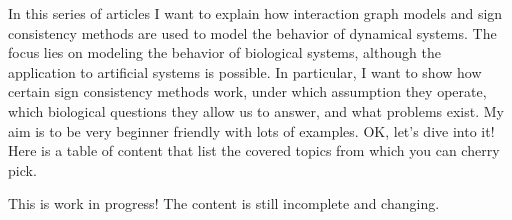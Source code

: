 In this series of articles I want to explain how interaction graph models
and sign consistency methods are used to model the behavior of dynamical systems.
The focus lies on modeling the behavior of biological systems, although the application to artificial systems is possible.
In particular, I want to show how certain sign consistency methods work, 
 under which assumption they operate,
 which biological questions they allow us to answer,
 and what problems exist. 
My aim is to be very beginner friendly with lots of examples. 
OK, let's dive into it!
Here is a table of content that list the covered topics from which you can cherry pick.

\bigskip
This is work in progress! The content is still incomplete and changing.
